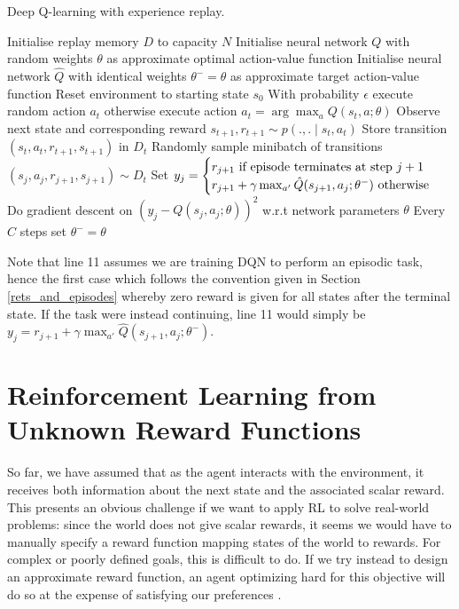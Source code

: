 \documentclass[11pt, a4paper, bibliography=totoc]{report}
\begin{document}
\begin{algorithm}
	\caption{Deep Q-learning with experience replay.}
	\label{alg:dqn}
	\begin{algorithmic}[1]
		\State Initialise replay memory $ D $ to capacity $ N $
		\State Initialise neural network $ Q $ with random weights $ \theta $ as approximate optimal action-value function
		\State Initialise neural network $ \hat{Q} $ with identical weights $ \theta^- = \theta $ as approximate target action-value function
		\State Reset environment to starting state $ s_0 $
		\State With probability $ \epsilon $ execute random action $ a_t $
		\State otherwise execute action $ a_t = \arg\max_a Q(s_t, a ; \theta) $
		\State Observe next state and corresponding reward $ s_{t+1}, r_{t+1} \sim p(.,.\mid s_t,a_t) $
		\State Store transition $ (s_t, a_t, r_{t+1}, s_{t+1}) $ in $ D_t $
		\State Randomly sample minibatch of transitions $ (s_j, a_j, r_{j+1}, s_{j+1}) \sim D_t $
		\State Set $ y_j = \begin{cases}
		                   r_{j+1} \text{ if episode terminates at step $ j+1 $} \\
		                   r_{j+1} + \gamma \max_{a'} \hat{Q}(s_{j+1}, a_j ; \theta^- ) \text{ otherwise}
		\end{cases}$
		\State Do gradient descent on $ (y_j - Q(s_j, a_j ; \theta))^2 $ w.r.t network parameters $ \theta $
		\State Every $ C $ steps set $ \theta^- = \theta $
		\EndFor
	\end{algorithmic}
\end{algorithm}

Note that line 11 assumes we are training DQN to perform an episodic task, hence the first case which follows the convention given in Section \ref{rets_and_episodes} whereby zero reward is given for all states after the terminal state. If the task were instead continuing, line 11 would simply be $ y_j = r_{j+1} + \gamma \max_{a'} \hat{Q}(s_{j+1}, a_j ; \theta^- ) $.

\section{Reinforcement Learning from Unknown Reward Functions}
So far, we have assumed that as the agent interacts with the environment, it receives both information about the next state and the associated scalar reward. This presents an obvious challenge if we want to apply RL to solve real-world problems: since the world does not give scalar rewards, it seems we would have to manually specify a reward function mapping states of the world to rewards. For complex or poorly defined goals, this is difficult to do. If we try instead to design an approximate reward function, an agent optimizing hard for this objective will do so at the expense of satisfying our preferences \cite[p.~1]{Christiano2017}.
\end{document}
